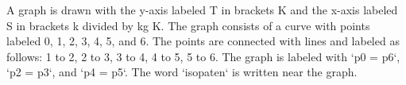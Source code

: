 A graph is drawn with the y-axis labeled T in brackets K and the x-axis labeled S in brackets k divided by kg K. The graph consists of a curve with points labeled 0, 1, 2, 3, 4, 5, and 6. The points are connected with lines and labeled as follows: 1 to 2, 2 to 3, 3 to 4, 4 to 5, 5 to 6. The graph is labeled with `p0 = p6`, `p2 = p3`, and `p4 = p5`. The word `isopaten` is written near the graph.